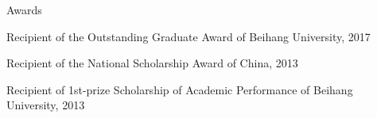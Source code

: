 \documentclass{resume} %
\begin{document}
\begin{rSection}{Awards} \itemsep -3pt
\item Recipient of the Outstanding Graduate Award of Beihang University, 2017
\item Recipient of the National Scholarship Award of China, 2013
\item Recipient of 1st-prize Scholarship of Academic Performance of Beihang University, 2013

\end{rSection}
\end{document}
